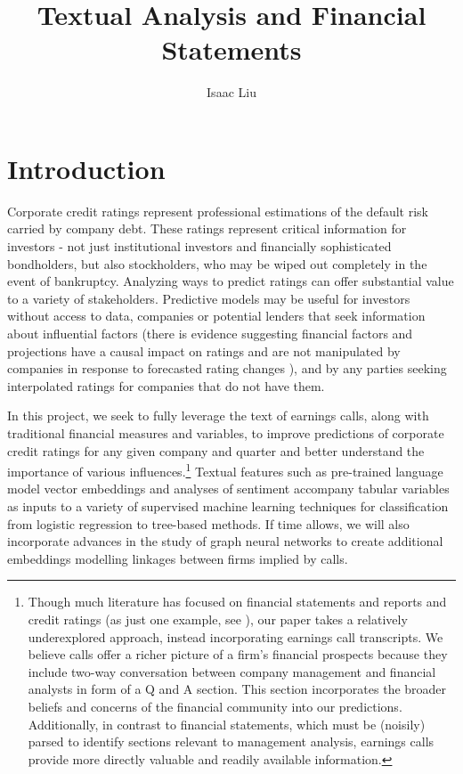 \documentclass{article}[11pt]
\title{Textual Analysis and Financial Statements}
\author{Isaac Liu}
\begin{document}
	\maketitle

    \section*{Introduction}

    Corporate credit ratings represent professional estimations of the default risk carried by company debt. These ratings represent critical information for investors - not just institutional investors and financially sophisticated bondholders, but also stockholders, who may be wiped out completely in the event of bankruptcy. Analyzing ways to predict ratings can offer substantial value to a variety of stakeholders. Predictive models may be useful for investors without access to data, companies or potential lenders that seek information about influential factors (there is evidence suggesting financial factors and projections have a causal impact on ratings and are not manipulated by companies in response to forecasted rating changes \citep{he_impact_2018}), and by any parties seeking interpolated ratings for companies that do not have them.

    In this project, we seek to fully leverage the text of earnings calls, along with traditional financial measures and variables, to improve predictions of corporate credit ratings for any given company and quarter and better understand the importance of various influences.\footnote{Though much literature has focused on financial statements and reports and credit ratings (as just one example, see \cite{makwana_understanding_2022}), our paper takes a relatively underexplored approach, instead incorporating earnings call transcripts. We believe calls offer a richer picture of a firm's financial prospects because they include two-way conversation between company management and financial analysts in form of a Q and A section. This section incorporates the broader beliefs and concerns of the financial community into our predictions. Additionally, in contrast to financial statements, which must be (noisily) parsed to identify sections relevant to management analysis, earnings calls provide more directly valuable and readily available information.} Textual features such as pre-trained language model vector embeddings \citep{araci_finbert_2019} and analyses of sentiment accompany tabular variables as inputs to a variety of supervised machine learning techniques for classification from logistic regression to tree-based methods. If time allows, we will also incorporate advances in the study of graph neural networks to create additional embeddings modelling linkages between firms \citep{das_credit_2023} implied by calls.
\end{document}

